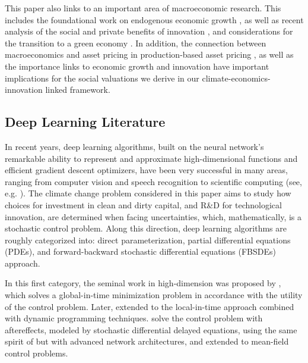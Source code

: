 \documentclass[12pt]{article}
\begin{document}
This paper also links to an important area of macroeconomic research. This includes the foundational work on endogenous economic growth \citep{brock1972optimal, baumol1986productivity, lucas1988mechanics, romer1990endogenous}, as well as recent analysis of the social and private benefits of innovation \citep{bloom2019toolkit, lucking2019have}, and considerations for the transition to a green economy \citep{Acemogluetal:2012, Acemogluetal:2016, jaakkola2019non}. In addition, the connection between macroeconomics and asset pricing in production-based asset pricing \citep{brock1982asset, cochrane1991production, jermann1998asset}, as well as the importance links to economic growth and innovation \citep{papanikolaou2011investment, kogan2014growth, kung2015innovation} have important implications for the social valuations we derive in our climate-economics-innovation linked framework.



\subsection{Deep Learning Literature}

In recent years, deep learning algorithms, built on the neural network's remarkable ability to represent and approximate high-dimensional functions and efficient gradient descent optimizers, have been very successful in many areas, ranging from computer vision and speech recognition to scientific computing (see, e.g. \cite{CaTr:17,GaDu:17,HaJeE:18,ZhHaE:18,han2019uniformly}). The climate change problem considered in this paper aims to study how choices for investment in clean and dirty capital, and R\&D for technological innovation, are determined when facing uncertainties, which, mathematically, is a stochastic control problem. Along this direction, deep learning algorithms are roughly categorized into: direct parameterization, partial differential equations (PDEs), and forward-backward stochastic differential equations (FBSDEs) approach.

In this first category, the seminal work in high-dimension was proposed by \cite{han2016deep}, which solves a global-in-time minimization problem in accordance with the utility of the control problem. Later, \cite{bachouch2021deepnumerical} extended to the local-in-time approach combined with dynamic programming techniques. \cite{han2020rnn} solve the control problem with aftereffects, modeled by stochastic differential delayed equations, using the same spirit of \cite{han2016deep} but with advanced network architectures, and \cite{carmona2022convergence} extended to mean-field control problems. 
\end{document}
